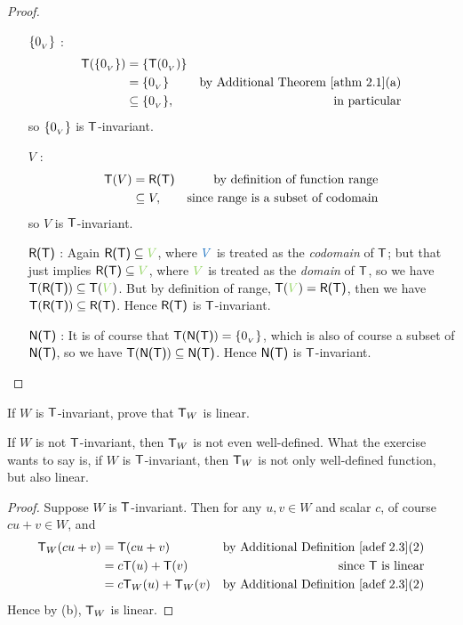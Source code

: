\begin{proof} \ 

\begin{enumerate}
\item[\(\{ 0_{_V} \}\)]:
    \begin{align*}
        \T(\{ \OV \}) & = \{ \T(\OV) \} \\
                      & = \{ \OV \} & \text{by \ATHM{2.1}(a)} \\
                      & \subseteq \{ \OV \}, & \text{in particular}
    \end{align*}
    so \(\{ 0_{_V} \}\) is \(\textsf{T}\)-invariant.
\item[\(V\)]:
    \begin{align*}
        \textsf{T}(V) & = \textsf{R(T)} & \text{by definition of function range} \\
              & \subseteq V, & \text{since range is a subset of codomain}
    \end{align*}
    so \(V\) is \(\textsf{T}\)-invariant.
\item[\(\textsf{R(T)}\)]:
    Again \(\RANGET \subseteq \GREEN{V}\), where \(\BLUE{V}\) is treated as the \emph{codomain} of \(\textsf{T}\);
    but that just implies \(\RANGET \subseteq \GREEN{V}\), where \(\GREEN{V}\) is treated as the \emph{domain} of \(\textsf{T}\), so we have \(\T(\RANGET) \subseteq \T(\GREEN{V})\).
    But by definition of range, \(\T(\GREEN{V}) = \RANGET\), then we have \(\textsf{T}(\textsf{R(T)}) \subseteq \textsf{R(T)}\).
    Hence \(\textsf{R(T)}\) is \(\textsf{T}\)-invariant.
\item[\(\textsf{N(T)}\)]:
    It is of course that \(\textsf{T}(\textsf{N(T)}) = \{ 0_{_V} \}\), which is also of course a subset of \(\textsf{N(T)}\), so we have \(\textsf{T}(\textsf{N(T)}) \subseteq \textsf{N(T)}\).
    Hence \(\textsf{N(T)}\) is \(\textsf{T}\)-invariant.
\end{enumerate}
\end{proof}

\begin{exercise} \label{exercise 2.1.30}
If \(W\) is \(\textsf{T}\)-invariant, prove that \(\textsf{T}_W\) is linear.
\end{exercise}

\begin{note}
If \(W\) is not \(\textsf{T}\)-invariant, then \(\textsf{T}_W\) is not even well-defined.
What the exercise wants to say is, if \(W\) is \(\textsf{T}\)-invariant, then \(\textsf{T}_W\) is not only well-defined function, but also linear.
\end{note}

\begin{proof}
Suppose \(W\) is \(\textsf{T}\)-invariant.
Then for any \(u, v \in W\) and scalar \(c\), of course \(cu + v \in W\), and
\begin{align*}
    \T_W(cu + v) & = \T(cu + v) & \text{by \ADEF{2.3}(2)} \\
                 & = c\T(u) + \T(v) & \text{since \(\T\) is linear} \\
                 & = c\T_W(u) + \T_W(v) & \text{by \ADEF{2.3}(2)}
\end{align*}
Hence by (b), \(\textsf{T}_W\) is linear.
\end{proof}


